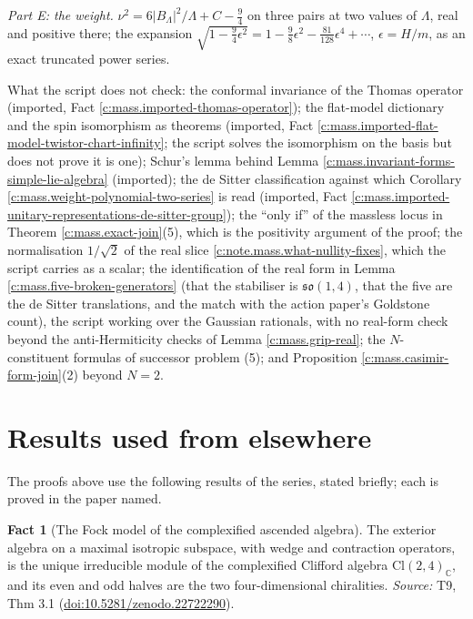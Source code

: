 \documentclass[11pt]{article}
\theoremstyle{definition}
\newtheorem{fact}[theorem]{Fact}
\theoremstyle{plain}
\providecommand{\C}{}\renewcommand{\C}{\mathbb{C}}
\providecommand{\Cl}{}\renewcommand{\Cl}{\mathrm{Cl}}
\begin{document}
\emph{Part E: the weight.} $\nu^{2} = 6|B_{\Lambda}|^{2}/\Lambda + C - \tfrac94$ on three pairs at two values of $\Lambda$, real and positive there; the expansion $\sqrt{1 - \tfrac94\epsilon^{2}} = 1 - \tfrac98\epsilon^{2} - \tfrac{81}{128}\epsilon^{4} + \cdots$, $\epsilon = H/m$, as an exact truncated power series.

What the script does not check: the conformal invariance of the Thomas operator (imported, Fact \ref{c:mass.imported-thomas-operator}); the flat-model dictionary and the spin isomorphism as theorems (imported, Fact \ref{c:mass.imported-flat-model-twistor-chart-infinity}; the script solves the isomorphism on the basis but does not prove it is one); Schur's lemma behind Lemma \ref{c:mass.invariant-forms-simple-lie-algebra} (imported); the de Sitter classification against which Corollary \ref{c:mass.weight-polynomial-two-series} is read (imported, Fact \ref{c:mass.imported-unitary-representations-de-sitter-group}); the ``only if'' of the massless locus in Theorem \ref{c:mass.exact-join}(5), which is the positivity argument of the proof; the normalisation $1/\sqrt2$ of the real slice \ref{c:note.mass.what-nullity-fixes}, which the script carries as a scalar; the identification of the real form in Lemma \ref{c:mass.five-broken-generators} (that the stabiliser is $\mathfrak{so}(1,4)$, that the five are the de Sitter translations, and the match with the action paper's Goldstone count), the script working over the Gaussian rationals, with no real-form check beyond the anti-Hermiticity checks of Lemma \ref{c:mass.grip-real}; the $N$-constituent formulas of successor problem (5); and Proposition \ref{c:mass.casimir-form-join}(2) beyond $N = 2$.

\section{Results used from elsewhere}
The proofs above use the following results of the series, stated briefly; each is proved in the paper named.

\begin{fact}[The Fock model of the complexified ascended algebra]\label{c:correspondence.fock-model-complexified-ascended-algebra}
The exterior algebra on a maximal isotropic subspace, with wedge and contraction operators, is the unique irreducible module of the complexified Clifford algebra $\Cl(2,4)_\C$, and its even and odd halves are the two four-dimensional chiralities.
\emph{Source:} T9, Thm 3.1 (\href{https://doi.org/10.5281/zenodo.22722290}{doi:10.5281/zenodo.22722290}).
\end{fact}
\end{document}
